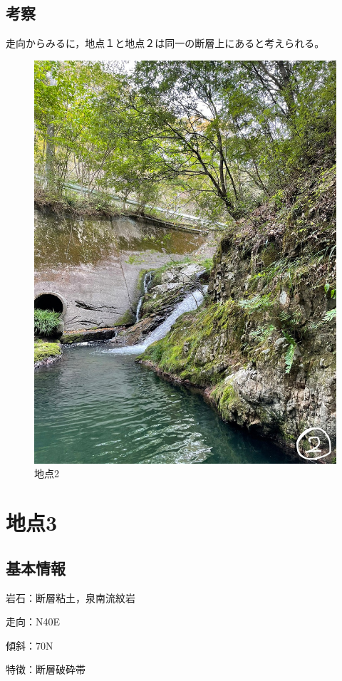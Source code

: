 \documentclass[uplatex,b5paper]{jsreport}
\begin{document}
    \subsection{考察}
    走向からみるに，地点１と地点２は同一の断層上にあると考えられる。
  \begin{figure}[h]
    \begin{center}
      \includegraphics[scale=0.3]{files/地学実習/地点2.jpg}
      \caption{地点2}
    \end{center}
  \end{figure}
  \clearpage

  \section{地点3}
    \subsection{基本情報}
    岩石：断層粘土，泉南流紋岩\par
    走向：N40\textdegree E\par
    傾斜：70\textdegree N\par
    特徴：断層破砕帯
\end{document}
